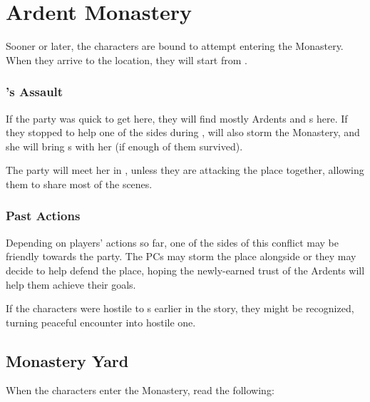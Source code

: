 \section{Ardent Monastery}
\label{sec:monastery}

Sooner or later, the characters are bound to attempt entering the Monastery. When they arrive to the location, they will start from .

\subsubsection{\npcHighmarshalName{}'s Assault}

If the party was quick to get here, they will find mostly Ardents and \enemyCultist{}s here. If they stopped to help one of the sides during , \npcHighmarshal{} will also storm the Monastery, and she will bring \enemyWallGuard{}s with her (if enough of them survived). 

The party will meet her in , unless they are attacking the place together, allowing them to share most of the scenes.

\subsubsection{Past Actions}

Depending on players' actions so far, one of the sides of this conflict may be friendly towards the party. The PCs may storm the place alongside \npcHighmarshal{} or they may decide to help defend the place, hoping the newly-earned trust of the Ardents will help them achieve their goals.

If the characters were hostile to \enemyCultistOfMoments{}s earlier in the story, they might be recognized, turning peaceful encounter into hostile one.





\subsection{Monastery Yard}
\label{ssec:monasteryYard}

When the characters enter the Monastery, read the following:


